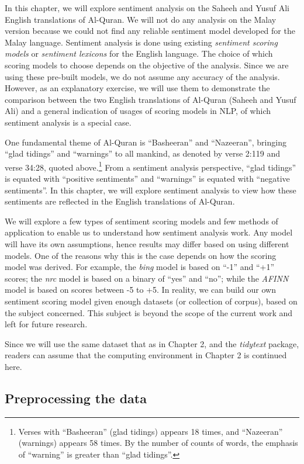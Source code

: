 \documentclass[
]{article}
\begin{document}
In this chapter, we will explore sentiment analysis on the Saheeh and Yusuf Ali English translations of Al-Quran. We will not do any analysis on the Malay version because we could not find any reliable sentiment model developed for the Malay language. Sentiment analysis is done using existing \emph{sentiment scoring models} or \emph{sentiment lexicons} for the English language. The choice of which scoring models to choose depends on the objective of the analysis. Since we are using these pre-built models, we do not assume any accuracy of the analysis. However, as an explanatory exercise, we will use them to demonstrate the comparison between the two English translations of Al-Quran (Saheeh and Yusuf Ali) and a general indication of usages of scoring models in NLP, of which sentiment analysis is a special case.

One fundamental theme of Al-Quran is ``Basheeran'' and ``Nazeeran'', bringing ``glad tidings'' and ``warnings'' to all mankind, as denoted by verse 2:119 and verse 34:28, quoted above.\footnote{Verses with ``Basheeran'' (glad tidings) appears 18 times, and ``Nazeeran'' (warnings) appears 58 times. By the number of counts of words, the emphasis of ``warning'' is greater than ``glad tidings''.} From a sentiment analysis perspective, ``glad tidings'' is equated with ``positive sentiments'' and ``warnings'' is equated with ``negative sentiments''. In this chapter, we will explore sentiment analysis to view how these sentiments are reflected in the English translations of Al-Quran.

We will explore a few types of sentiment scoring models and few methods of application to enable us to understand how sentiment analysis work. Any model will have its own assumptions, hence results may differ based on using different models. One of the reasons why this is the case depends on how the scoring model was derived. For example, the \emph{bing} model is based on ``-1'' and ``+1'' scores; the \emph{nrc} model is based on a binary of ``yes'' and ``no''; while the \emph{AFINN} model is based on scores between -5 to +5. In reality, we can build our own sentiment scoring model given enough datasets (or collection of corpus), based on the subject concerned. This subject is beyond the scope of the current work and left for future research.

Since we will use the same dataset that as in Chapter 2, and the \emph{tidytext} package, readers can assume that the computing environment in Chapter 2 is continued here.

\hypertarget{preprocessing-the-data}{%
\subsection{Preprocessing the data}\label{preprocessing-the-data}}
\end{document}
